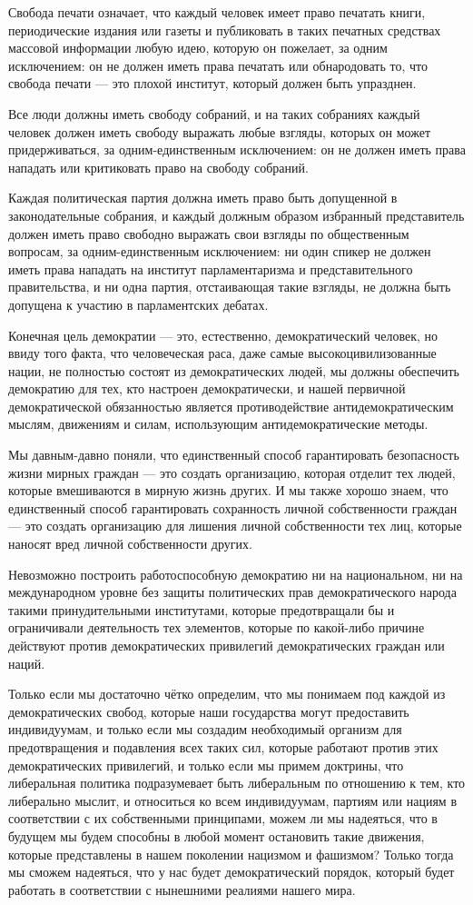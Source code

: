 Свобода печати означает, что каждый человек имеет право печатать книги, периодические издания или газеты и публиковать в таких печатных средствах массовой информации любую идею, которую он пожелает, за одним исключением: он не должен иметь права печатать или обнародовать то, что свобода печати — это плохой институт, который должен быть упразднен.

Все люди должны иметь свободу собраний, и на таких собраниях каждый человек должен иметь свободу выражать любые взгляды, которых он может придерживаться, за одним-единственным исключением: он не должен иметь права нападать или критиковать право на свободу собраний.

Каждая политическая партия должна иметь право быть допущенной в законодательные собрания, и каждый должным образом избранный представитель должен иметь право свободно выражать свои взгляды по общественным вопросам, за одним-единственным исключением: ни один спикер не должен иметь права нападать на институт парламентаризма и представительного правительства, и ни одна партия, отстаивающая такие взгляды, не должна быть допущена к участию в парламентских дебатах.

Конечная цель демократии — это, естественно, демократический человек, но ввиду того факта, что человеческая раса, даже самые высокоцивилизованные нации, не полностью состоят из демократических людей, мы должны обеспечить демократию для тех, кто настроен демократически, и нашей первичной демократической обязанностью является противодействие антидемократическим мыслям, движениям и силам, использующим антидемократические методы.

Мы давным-давно поняли, что единственный способ гарантировать безопасность жизни мирных граждан — это создать организацию, которая отделит тех людей, которые вмешиваются в мирную жизнь других. И мы также хорошо знаем, что единственный способ гарантировать сохранность личной собственности граждан — это создать организацию для лишения личной собственности тех лиц, которые наносят вред личной собственности других.

Невозможно построить работоспособную демократию ни на национальном, ни на международном уровне без защиты политических прав демократического народа такими принудительными институтами, которые предотвращали бы и ограничивали деятельность тех элементов, которые по какой-либо причине действуют против демократических привилегий демократических граждан или наций.

Только если мы достаточно чётко определим, что мы понимаем под каждой из демократических свобод, которые наши государства могут предоставить индивидуумам, и только если мы создадим необходимый организм для предотвращения и подавления всех таких сил, которые работают против этих демократических привилегий, и только если мы примем доктрины, что либеральная политика подразумевает быть либеральным по отношению к тем, кто либерально мыслит, и относиться ко всем индивидуумам, партиям или нациям в соответствии с их собственными принципами, можем ли мы надеяться, что в будущем мы будем способны в любой момент остановить такие движения, которые представлены в нашем поколении нацизмом и фашизмом? Только тогда мы сможем надеяться, что у нас будет демократический порядок, который будет работать в соответствии с нынешними реалиями нашего мира.
